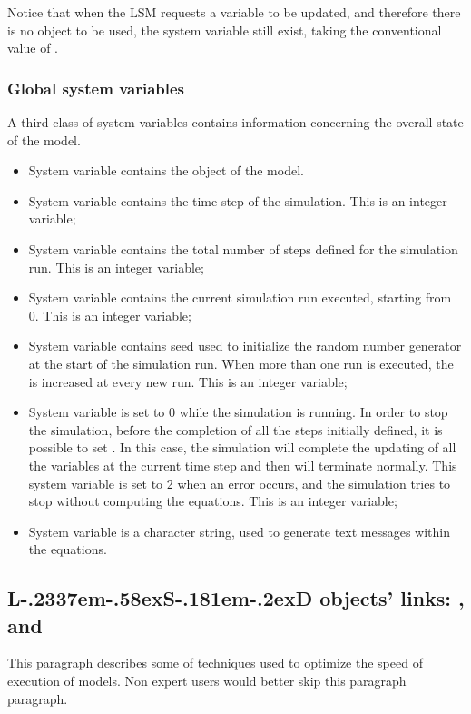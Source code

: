\documentclass [11pt,a4paper] {book}
\def\LsD{{L\kern-.2337em\lower-.58ex\hbox{S}\kern-.181em\lower-.2ex\hbox{D}}\xspace}
\begin{document}
Notice that when the LSM requests a variable to be updated, and therefore there is no object to be used, the system variable  still exist, taking the conventional value of .

\subsubsection{Global system variables}

A third class of system variables contains information concerning the overall state of the model. 

\begin{itemize}
  \item System variable  contains the  object of the model.
	\item System variable  contains the time step of the simulation. This is an integer variable;
	\item System variable  contains the total number of steps defined for the simulation run. This is an integer variable;
	\item System variable  contains the current simulation run executed, starting from 0. This is an integer variable;
	\item System variable  contains seed used to initialize the random number generator at the start of the simulation run. When more than one run is executed, the  is increased at every new run. This is an integer variable;
	\item System variable  is set to 0 while the simulation is running. In order to stop the simulation, before the completion of all the steps initially defined, it is possible to set . In this case, the simulation will complete the updating of all the variables at the current time step and then will terminate normally. This system variable is set to 2 when an error occurs, and the simulation tries to stop without computing the equations. This is an integer variable;
	\item System variable  is a character string, used to generate text messages within the equations. 
\end{itemize}






\subsection{\LsD objects' links: ,  and }
This paragraph describes some of techniques used to optimize the speed of execution of models. Non expert users would better skip this paragraph paragraph.
\end{document}
